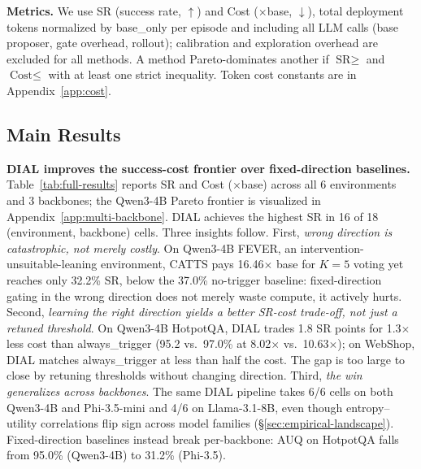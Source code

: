 
\vspace{-0.025in}
\textbf{Metrics.} We use SR (success rate, $\uparrow$) and Cost
($\times$base, $\downarrow$), total deployment tokens normalized by
base\_only per episode and including all LLM calls (base proposer, gate
overhead, rollout); calibration and exploration overhead are excluded
for all methods. A method Pareto-dominates another if
$\text{SR}\geq$ and $\text{Cost}\leq$ with at least one strict inequality.
Token cost constants are in Appendix~\ref{app:cost}.
\vspace{-0.15in}
\subsection{Main Results}
\label{sec:main-results}
\vspace{-0.1in}


\textbf{DIAL improves the success-cost frontier over fixed-direction baselines.}
Table~\ref{tab:full-results} reports SR and Cost ($\times$base) across all 6 environments and 3 backbones; the Qwen3-4B Pareto frontier is visualized in Appendix~\ref{app:multi-backbone}. DIAL
achieves the highest SR in 16 of 18 (environment, backbone) cells. Three insights follow.
First, \emph{wrong direction is catastrophic, not merely costly}.
On Qwen3-4B FEVER, an intervention-unsuitable-leaning environment, CATTS pays 16.46$\times$ base for $K{=}5$ voting yet reaches only 32.2\% SR, below the 37.0\% no-trigger baseline: fixed-direction gating in the wrong direction
does not merely waste compute, it actively hurts.
Second, \emph{learning the right direction yields a better SR-cost trade-off, not just a retuned threshold}. On Qwen3-4B HotpotQA, DIAL trades 1.8 SR points for 1.3$\times$ less cost than always\_trigger (95.2 vs.\ 97.0\% at 8.02$\times$ vs.\ 10.63$\times$); on WebShop, DIAL matches always\_trigger at less than half the cost. The gap is too large
to close by retuning thresholds without changing direction.
Third, \emph{the win generalizes across backbones}. The same DIAL pipeline takes 6/6 cells on both Qwen3-4B and Phi-3.5-mini and 4/6 on Llama-3.1-8B, even though entropy--utility correlations flip sign across model families (\S\ref{sec:empirical-landscape}). Fixed-direction baselines instead break per-backbone: AUQ on HotpotQA falls from 95.0\% (Qwen3-4B) to 31.2\% (Phi-3.5).



